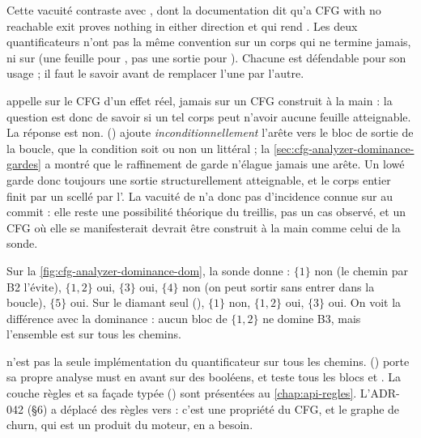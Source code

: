 \begin{remarque}
  Cette vacuité contraste avec , dont la documentation
  dit qu'\og a CFG with no reachable exit proves nothing in either
  direction\fg{} et qui rend . Les deux quantificateurs n'ont pas
  la même convention sur un corps qui ne termine jamais, ni sur
   (une feuille pour , pas une sortie pour
  ). Chacune est défendable pour son usage ; il faut le
  savoir avant de remplacer l'une par l'autre.

   appelle  sur le CFG d'un
  effet réel, jamais sur un CFG construit à la main : la question est donc
  de savoir si un tel corps peut n'avoir aucune feuille atteignable. La
  réponse est non. 
  () ajoute
  \emph{inconditionnellement} l'arête  vers le bloc de sortie
  de la boucle, que la condition soit ou non un littéral  ; la
  \cref{sec:cfg-analyzer-dominance-gardes} a montré que le raffinement de
  garde n'élague jamais une arête. Un  lowé garde donc
  toujours une sortie structurellement atteignable, et le corps entier finit
  par un  scellé par l'. La vacuité de
   n'a donc pas d'incidence connue sur
   au commit \snapshotCommit{} : elle reste une
  possibilité théorique du treillis, pas un cas observé, et un CFG où elle
  se manifesterait devrait être construit à la main comme celui de la sonde.
\end{remarque}

Sur la \cref{fig:cfg-analyzer-dominance-dom}, la sonde donne :
$\{1\}$ non (le chemin par B2 l'évite), $\{1, 2\}$ oui, $\{3\}$ oui,
$\{4\}$ non (on peut sortir sans entrer dans la boucle), $\{5\}$ oui. Sur le
diamant seul (), $\{1\}$ non,
$\{1,2\}$ oui, $\{3\}$ oui. On voit la différence avec la dominance : aucun
bloc de $\{1, 2\}$ ne domine B3, mais l'ensemble est sur tous les chemins.

 n'est pas la seule implémentation du quantificateur
\og sur tous les chemins\fg. 
() porte sa propre analyse must en
avant sur des booléens, et teste tous les blocs  et
. La couche règles et sa façade typée
 () sont
présentées au \cref{chap:api-regles}. L'ADR-042 (§6) a déplacé
 des règles vers  : c'est une
propriété du CFG, et le graphe de churn, qui est un produit du moteur, en a
besoin.

